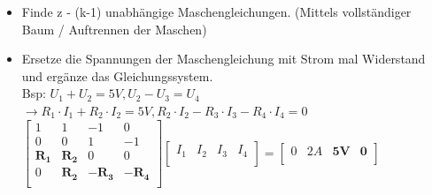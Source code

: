 \begin{center}
\begin{itemize}
		      			\item Finde z - (k-1) unabhängige Maschengleichungen. (Mittels vollständiger Baum / Auftrennen der Maschen)
		      			\item Ersetze die Spannungen der Maschengleichung mit Strom mal Widerstand und ergänze das Gleichungssystem.
		      			\\ Bsp:
		      			$U_1 + U_2 = 5V, U_2 - U_3 = U_4$ \\ $ \rightarrow R_1 \cdot I_1 + R_2 \cdot I_2 = 5V, R_2 \cdot I_2 - R_3 \cdot I_3 - R_4 \cdot I_4 = 0$ \\
		      			$
		      			\left[ {\begin{array}{cccc}
		      					1 & 1 & -1 & 0 \\
		      					0 & 0 & 1 & -1 \\
		      					\mathbf{R_1} & \mathbf{R_2} & 0 & 0 \\
		      					0 & \mathbf{R_2} & \mathbf{-R_3} & \mathbf{-R_4} \\
		      					\end{array} } \right] \left[ {\begin{array}{c} I_1 & I_2 & I_3 & I_4 \\ \end{array} } \right] =   \left[ {\begin{array}{c}  0 & 2A & \mathbf{5V} & \mathbf{0} \\ \end{array} } \right] $ \\

		      						\end{itemize}
		      						\end{center}
		      						\iend
